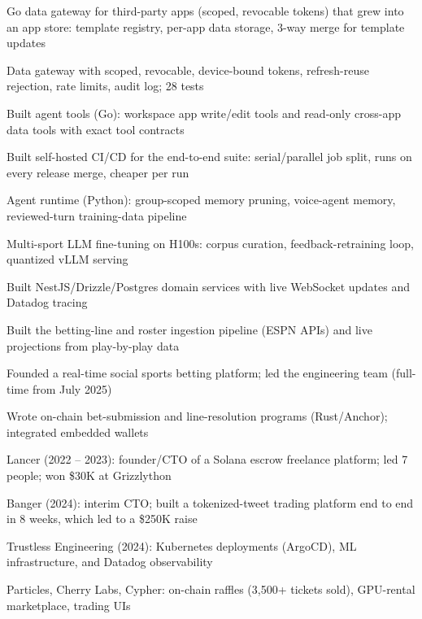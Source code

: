 \documentclass[print]{jack-resume}
\begin{document}
\begin{tightemize}
    \item Go data gateway for third-party apps (scoped, revocable tokens) that grew into an app store: template registry, per-app data storage, 3-way merge for template updates
    \item Data gateway with scoped, revocable, device-bound tokens, refresh-reuse rejection, rate limits, audit log; 28 tests
    \item Built agent tools (Go): workspace app write/edit tools and read-only cross-app data tools with exact tool contracts
    \item Built self-hosted CI/CD for the end-to-end suite: serial/parallel job split, runs on every release merge, cheaper per run
    \item Agent runtime (Python): group-scoped memory pruning, voice-agent memory, reviewed-turn training-data pipeline
    \item Multi-sport LLM fine-tuning on H100s: corpus curation, feedback-retraining loop, quantized vLLM serving
\end{tightemize}
\sectionsep

\begin{tightemize}
    \item Built NestJS/Drizzle/Postgres domain services with live WebSocket updates and Datadog tracing
    \item Built the betting-line and roster ingestion pipeline (ESPN APIs) and live projections from play-by-play data
    \item Founded a real-time social sports betting platform; led the engineering team (full-time from July 2025)
    \item Wrote on-chain bet-submission and line-resolution programs (Rust/Anchor); integrated embedded wallets
\end{tightemize}
\sectionsep

\begin{tightemize}
    \item Lancer (2022 – 2023): founder/CTO of a Solana escrow freelance platform; led 7 people; won \$30K at Grizzlython
    \item Banger (2024): interim CTO; built a tokenized-tweet trading platform end to end in 8 weeks, which led to a \$250K raise
    \item Trustless Engineering (2024): Kubernetes deployments (ArgoCD), ML infrastructure, and Datadog observability
    \item Particles, Cherry Labs, Cypher: on-chain raffles (3,500+ tickets sold), GPU-rental marketplace, trading UIs
\end{tightemize}
\sectionsep
\end{document}

